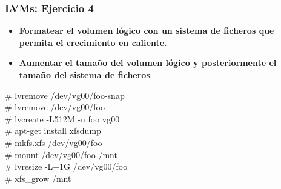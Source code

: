 \documentclass{beamer}
\begin{document}
\begin{frame}
  \frametitle{LVMs: Ejercicio 4}

\begin{itemize}
\item \textbf{Formatear el volumen lógico con un sistema de ficheros que permita el crecimiento en caliente.}
\item \textbf{Aumentar el tamaño del volumen lógico y posteriormente el tamaño del sistema de ficheros}
\end{itemize}

\pause

  \begin{block}{}
\# lvremove /dev/vg00/foo-snap \\
\# lvremove /dev/vg00/foo \\
 
\# lvcreate -L512M -n foo vg00 \\

\# apt-get install xfsdump \\

\# mkfs.xfs /dev/vg00/foo \\
\# mount /dev/vg00/foo /mnt \\

\# lvresize -L+1G /dev/vg00/foo \\

\# xfs\_grow /mnt
  \end{block}

\end{frame}





\end{document}
